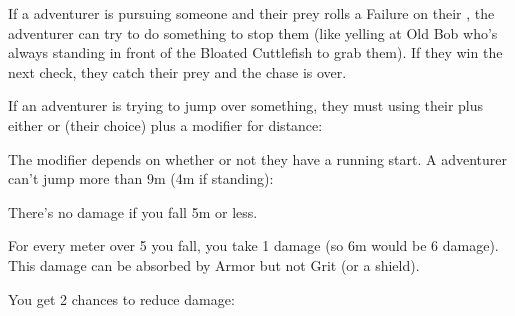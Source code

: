 {  If a adventurer is pursuing someone and their prey rolls a Failure on their \MD, the adventurer can try to do something to stop them (like yelling at Old Bob who's always standing in front of the Bloated Cuttlefish to grab them).  If they win the next check, they catch their prey and the chase is over.



  If an adventurer is trying to jump over something, they must \RO using their \MD plus either \VIG or \DEX (their choice) plus a modifier for distance:


  The modifier depends on whether or not they have a running start. A adventurer can't jump more than 9m (4m if standing):




  There's no damage if you fall 5m or less.  

  For every meter over 5 you fall, you take 1 damage (so 6m would be 6 damage).  This damage can be absorbed by Armor but not Grit (or a shield).  

  You get 2 chances to reduce damage:

}
